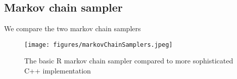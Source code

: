 \subsection{Markov chain sampler}
We compare the two markov chain samplers
\begin{figure}[h!]
    \centering
    \texttt{[image: figures/markovChainSamplers.jpeg]}
    \caption{The basic R markov chain sampler compared to more sophisticated C++ implementation}
    \label{markovChainRvRcpp}
\end{figure}